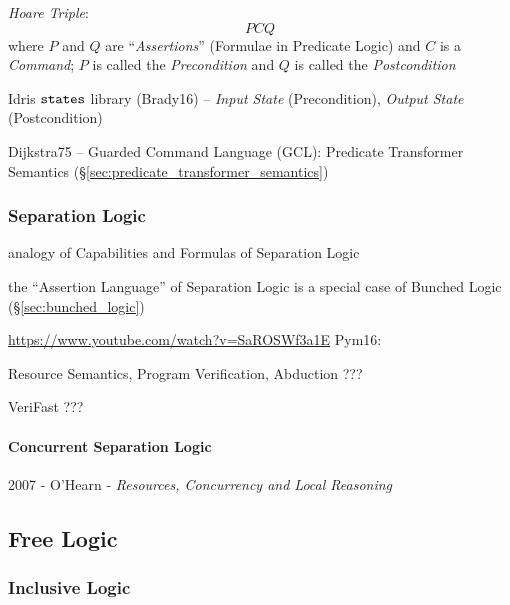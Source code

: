 \emph{Hoare Triple}:
\[
  {P} C {Q}
\]
where $P$ and $Q$ are ``\emph{Assertions}'' (Formulae in Predicate
Logic) and $C$ is a \emph{Command}; $P$ is called the
\emph{Precondition} and $Q$ is called the \emph{Postcondition}

Idris $\mathtt{states}$ library (Brady16) -- \emph{Input State}
(Precondition), \emph{Output State} (Postcondition)

Dijkstra75 -- Guarded Command Language (GCL): Predicate Transformer
Semantics (\S\ref{sec:predicate_transformer_semantics})



\subsubsection{Separation Logic}\label{sec:separation_logic}

analogy of Capabilities and Formulas of Separation Logic

the ``Assertion Language'' of Separation Logic is a special case of
Bunched Logic (\S\ref{sec:bunched_logic})


\url{https://www.youtube.com/watch?v=SaROSWf3a1E} Pym16:

Resource Semantics, Program Verification, Abduction ???

VeriFast ???



\paragraph{Concurrent Separation Logic}
\label{sec:concurrent_separation}\hfill

2007 - O'Hearn - \emph{Resources, Concurrency and Local Reasoning}



\subsection{Free Logic}\label{sec:free_logic}

\subsubsection{Inclusive Logic}\label{sec:inclusive_logic}



